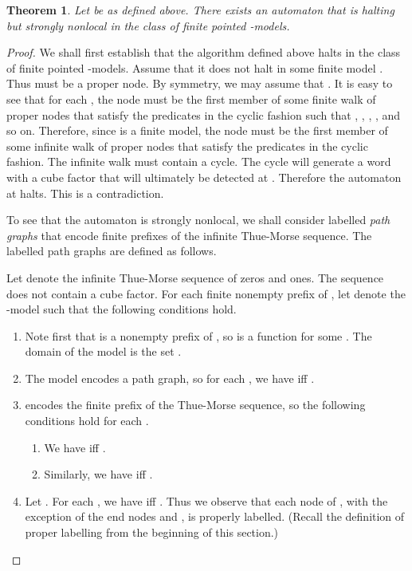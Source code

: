 \documentclass[copyright,creativecommons]{eptcs}
\newtheorem{theorem}{Theorem}[section]
\begin{document}
\begin{theorem}\label{secondmain}
Let  be as defined above.
There exists an  automaton  that is halting but
strongly nonlocal in the class of finite pointed -models.
\end{theorem}
\begin{proof}
We shall first establish that the algorithm defined above halts in the class of finite pointed
-models.
Assume that it does not halt in some finite model .
Thus  must be a proper node.
By symmetry, we may assume that .
It is easy to see that for each , the node  must be the first member  of
some finite walk  of proper nodes that satisfy the predicates 
in the cyclic fashion such that
, , ,
,
and so on.
Therefore, since  is a finite model,  the node  must be the first member  of
some infinite walk  of proper nodes that satisfy the predicates  in
the cyclic fashion. The infinite walk must contain a cycle.
The cycle will generate a word with a cube factor that will ultimately be detected at .
Therefore the automaton at  halts. This is a contradiction.




To see that the automaton is strongly nonlocal, we shall consider labelled \emph{path graphs}
that encode finite prefixes of the infinite Thue-Morse sequence.
The labelled path graphs are defined as follows.




Let  denote the infinite Thue-Morse sequence of zeros and ones. The sequence
does not contain a cube factor. For each finite nonempty prefix  of ,
let  denote the
-model  such that the following conditions hold.
\begin{enumerate}
\item
Note first that  is a nonempty prefix of , so   is a function 
 for some .
The domain of the model  is the set .
\item
The model  encodes a path graph, so for each ,
we have  iff .
\item
 encodes the finite prefix  of the Thue-Morse sequence, so
the following conditions hold for each .
\begin{enumerate}
\item
We have  iff .
\item
Similarly, we have  iff .
\end{enumerate}
\item
Let .
For each , we have  iff    .
Thus we observe that each node of , with the exception of the end nodes  and , is
properly labelled. (Recall the definition of proper labelling from the beginning of this section.)
\end{enumerate}





\end{proof}
\end{document}
